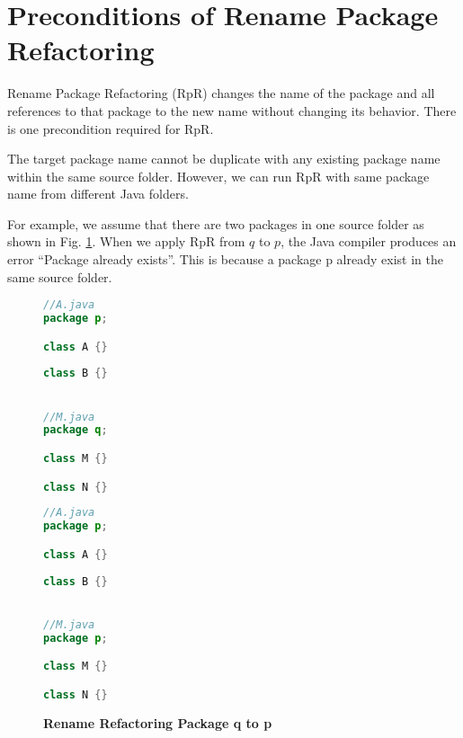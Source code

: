 \section{\textbf{Preconditions of Rename Package Refactoring}}
Rename Package Refactoring (RpR) changes the name of the package and all references to that package to the new name without changing its behavior. There is one precondition required for RpR.

The target package name cannot be duplicate with any existing package name within the same source folder. However, we can run RpR with same package name from different Java folders.

For example, we assume that there are two packages in one source folder as shown in Fig. \ref{fig:RpR}. When we apply RpR from $q$ to $p$, the Java compiler produces an error ``Package already exists''. This is because a package p already exist in the same source folder. 

\begin{figure}[th]
\centering
\begin{minipage}[t]{0.45\linewidth}
\begin{lstlisting}[language=java, basicstyle=\scriptsize\ttfamily,frame=single]
//A.java
package p;

class A {}
	
class B {}


//M.java
package q;

class M {}	

class N {}
\end{lstlisting}
\end{minipage}
\hfill
\begin{minipage}[t]{0.45\linewidth}
\begin{lstlisting}[language=java, basicstyle=\scriptsize\ttfamily,frame=single]
//A.java
package p;

class A {}
	
class B {}


//M.java
package p;

class M {}	

class N {}


\end{lstlisting}
\end{minipage}
\caption{\textbf{Rename Refactoring Package q to p}}
\label{fig:RpR}
\end{figure}
